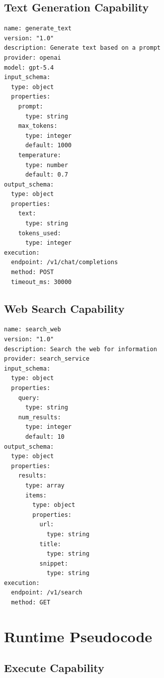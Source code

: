 \subsection{Text Generation Capability}

\begin{lstlisting}[style=yamlstyle]
name: generate_text
version: "1.0"
description: Generate text based on a prompt
provider: openai
model: gpt-5.4
input_schema:
  type: object
  properties:
    prompt:
      type: string
    max_tokens:
      type: integer
      default: 1000
    temperature:
      type: number
      default: 0.7
output_schema:
  type: object
  properties:
    text:
      type: string
    tokens_used:
      type: integer
execution:
  endpoint: /v1/chat/completions
  method: POST
  timeout_ms: 30000
\end{lstlisting}

\subsection{Web Search Capability}

\begin{lstlisting}[style=yamlstyle]
name: search_web
version: "1.0"
description: Search the web for information
provider: search_service
input_schema:
  type: object
  properties:
    query:
      type: string
    num_results:
      type: integer
      default: 10
output_schema:
  type: object
  properties:
    results:
      type: array
      items:
        type: object
        properties:
          url:
            type: string
          title:
            type: string
          snippet:
            type: string
execution:
  endpoint: /v1/search
  method: GET
\end{lstlisting}

\section{Runtime Pseudocode}
\label{appendix:pseudocode}

\subsection{Execute Capability}

